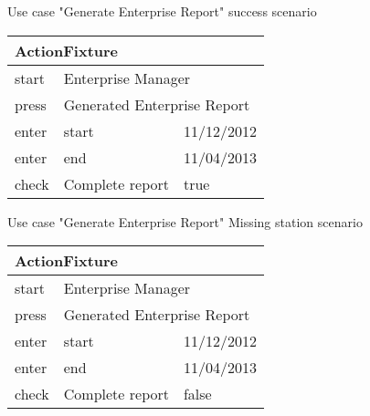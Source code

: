 
\noindent Use case "Generate Enterprise Report" success scenario
\madeby{\mb}{\kj}

\vspace{0.4cm}
\begin{tabular}{| p{2cm} | p{5.5cm} | p{5.5cm} |} \hline
\multicolumn{3}{|l|}{ActionFixture} \\ \hline
start & \multicolumn{2}{|l|}{Enterprise Manager} \\ \hline
press & \multicolumn{2}{|l|}{Generated Enterprise Report} \\ \hline
enter & start & 11/12/2012 \\ \hline
enter & end & 11/04/2013 \\ \hline
check & Complete report & true \\ \hline
\end{tabular}
\vspace{0.8cm}

\noindent Use case "Generate Enterprise Report" Missing station scenario
\madeby{\mb}{\kj}

\vspace{0.4cm}
\begin{tabular}{| p{2cm} | p{5.5cm} | p{5.5cm} |} \hline
\multicolumn{3}{|l|}{ActionFixture} \\ \hline
start & \multicolumn{2}{|l|}{Enterprise Manager} \\ \hline
press & \multicolumn{2}{|l|}{Generated Enterprise Report} \\ \hline
enter & start & 11/12/2012 \\ \hline
enter & end & 11/04/2013 \\ \hline
check & Complete report & false \\ \hline
\end{tabular}
\vspace{0.8cm}
